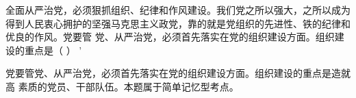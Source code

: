 \question 全面从严治党，必须狠抓组织、纪律和作风建设。我们党之所以强大，之所以成为得到人民衷心拥护的坚强马克思主义政党，靠的就是党组织的先进性、铁的纪律和优良的作风。党要管
党、从严治党，必须首先落实在党的组织建设方面。组织建设的重点是（ ） '
\par{}
\begin{solution}党要管党、从严治党，必须首先落实在党的组织建设方面。组织建设的重点是造就高
素质的党员、干部队伍。本题属于简单记忆型考点。
\end{solution}
